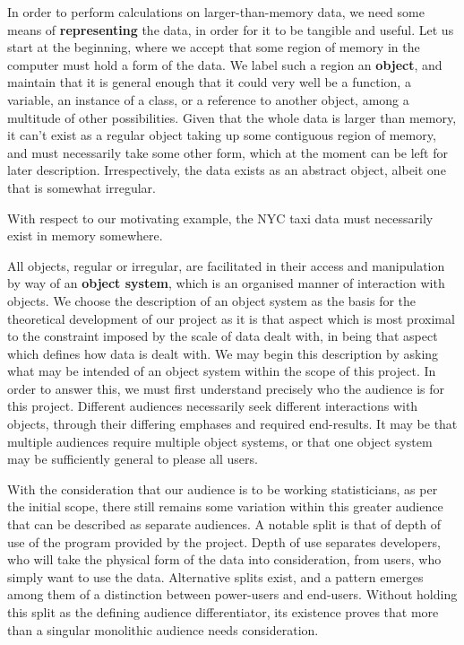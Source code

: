In order to perform calculations on larger-than-memory data, we need
some means of \textbf{representing} the data, in order for it to be
tangible and useful. Let us start at the beginning, where we accept that
some region of memory in the computer must hold a form of the data. We
label such a region an \textbf{object}, and maintain that it is general
enough that it could very well be a function, a variable, an instance of
a class, or a reference to another object, among a multitude of other
possibilities. Given that the whole data is larger than memory, it can't
exist as a regular object taking up some contiguous region of memory,
and must necessarily take some other form, which at the moment can be
left for later description. Irrespectively, the data exists as an
abstract object, albeit one that is somewhat irregular.

With respect to our motivating example, the NYC taxi data must
necessarily exist in memory somewhere.

All objects, regular or irregular, are facilitated in their access and
manipulation by way of an \textbf{object system}, which is an organised
manner of interaction with objects. We choose the description of an
object system as the basis for the theoretical development of our
project as it is that aspect which is most proximal to the constraint
imposed by the scale of data dealt with, in being that aspect which
defines how data is dealt with. We may begin this description by asking
what may be intended of an object system within the scope of this
project. In order to answer this, we must first understand precisely who
the audience is for this project. Different audiences necessarily seek
different interactions with objects, through their differing emphases
and required end-results. It may be that multiple audiences require
multiple object systems, or that one object system may be sufficiently
general to please all users.

With the consideration that our audience is to be working statisticians,
as per the initial scope, there still remains some variation within this
greater audience that can be described as separate audiences. A notable
split is that of depth of use of the program provided by the project.
Depth of use separates developers, who will take the physical form of
the data into consideration, from users, who simply want to use the
data. Alternative splits exist, and a pattern emerges among them of a
distinction between power-users and end-users. Without holding this
split as the defining audience differentiator, its existence proves that
more than a singular monolithic audience needs consideration.

